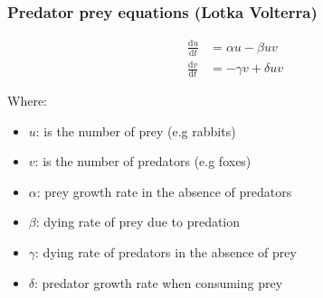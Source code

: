 \documentclass[xcolor=table]{beamer}
\begin{document}
\begin{frame}[fragile]
\frametitle{Predator prey equations (Lotka Volterra)}


\begin{align*}
    \frac{\mathrm{d}u}{\mathrm{d}t} &= \alpha u - \beta uv\\[1em]
\frac{\mathrm{d}v}{\mathrm{d}t} &= -\gamma v + \delta uv 
\end{align*}





Where:

\begin{itemize}
\item $u$: is the number of prey (e.g rabbits)
\item $v$: is the number of predators (e.g foxes)
\item $\alpha$: prey growth rate in the absence of predators
\item $\beta$: dying rate of prey due to predation
\item $\gamma$: dying rate of predators in the absence of prey
\item $\delta$: predator growth rate when consuming prey
\end{itemize}


\end{frame}
\end{document}
